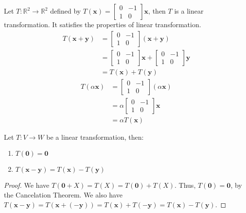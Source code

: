 \documentclass[11pt]{report}
\begin{document}
\begin{example}
    Let $T: \mathbb{R}^2 \rightarrow \mathbb{R}^2$ defined by $T(\textbf{x}) = \begin{bmatrix} 0 & -1 \\ 1 & 0 \end{bmatrix}\textbf{x}$, then $T$ is a linear transformation. It satisfies the properties of linear transformation.
    \begin{align*}
        T(\textbf{x} + \textbf{y}) &= \begin{bmatrix} 0 & -1 \\ 1 & 0 \end{bmatrix}(\textbf{x} + \textbf{y}) \\
        &= \begin{bmatrix} 0 & -1 \\ 1 & 0 \end{bmatrix}\textbf{x} + \begin{bmatrix} 0 & -1 \\ 1 & 0 \end{bmatrix}\textbf{y} \\
        &= T(\textbf{x}) + T(\textbf{y})
    \end{align*}
    \begin{align*}
        T(\alpha \textbf{x}) &= \begin{bmatrix} 0 & -1 \\ 1 & 0 \end{bmatrix}(\alpha \textbf{x}) \\
        &= \alpha \begin{bmatrix} 0 & -1 \\ 1 & 0 \end{bmatrix}\textbf{x} \\
        &= \alpha T(\textbf{x})
    \end{align*}
    
\end{example}
\begin{theorem}
    Let $T: V \rightarrow W$ be a linear transformation, then:
    \begin{enumerate}
        \item $T(\textbf{0}) = \textbf{0}$
        \item $T(\textbf{x} - \textbf{y}) = T(\textbf{x}) - T(\textbf{y})$
    \end{enumerate}
\end{theorem}
\begin{proof}
    We have $T(\textbf{0} + X) = T(X) = T(\textbf{0}) + T(X)$. Thus, $T(\textbf{0}) = \textbf{0}$, by the Cancelation Theorem. We also have $T(\textbf{x} - \textbf{y}) = T(\textbf{x} + (-\textbf{y})) = T(\textbf{x}) + T(-\textbf{y}) = T(\textbf{x}) - T(\textbf{y})$.
\end{proof}
\end{document}
